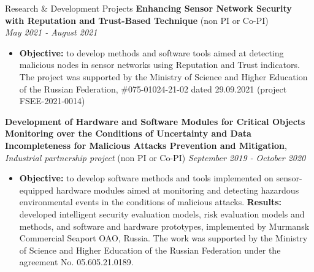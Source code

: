 \documentclass[10pt]{resume} %
\begin{document}
\begin{rSection}{Research \& Development Projects}
{\bf Enhancing Sensor Network Security with Reputation and Trust-Based Technique} (non PI or Co-PI)\\ \hspace*{\fill} {\em May 2021 - August 2021}
\vspace{-0.2cm}
\begin{itemize}
\itemsep-0.8em 
\item \textbf{Objective:} to develop methods and software tools aimed at detecting malicious nodes in sensor networks using Reputation and Trust indicators. 
The project was supported by the Ministry of Science and Higher Education of the Russian Federation, \#075-01024-21-02 dated 29.09.2021 (project FSEE-2021-0014)    
\end{itemize}

{\bf Development of Hardware and Software Modules for Critical Objects Monitoring over the Conditions of Uncertainty and Data Incompleteness for Malicious Attacks Prevention and Mitigation}, \textit{Industrial partnership project} (non PI or Co-PI) \hspace*{\fill} {\em September 2019 - October 2020}
\vspace{-0.2cm}
\begin{itemize}
\itemsep-0.5em
\item \textbf{Objective:} to develop software methods and tools implemented on sensor-equipped hardware modules aimed at monitoring and detecting hazardous environmental events in the conditions of malicious attacks. \textbf{Results:} developed intelligent security evaluation models, risk evaluation models and methods, and software and hardware prototypes, implemented by Murmansk Commercial Seaport OAO, Russia. The work was supported by the Ministry of Science and Higher Education of the Russian Federation under the agreement No. 05.605.21.0189. %
\end{itemize}


\end{rSection}
\end{document}
